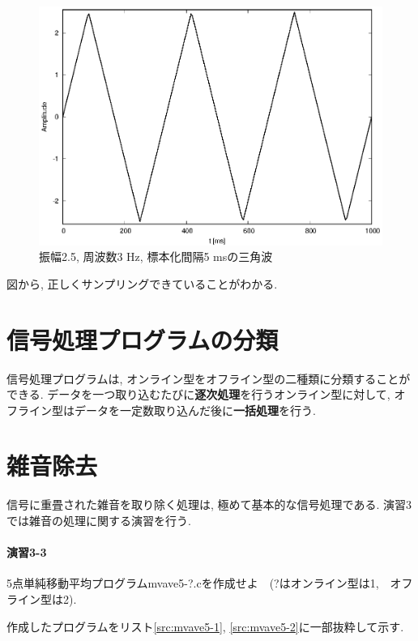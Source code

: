 \documentclass[titlepage]{jsarticle}
\begin{document}
        \begin{figure}[h]
            \centering
            \includegraphics[width=0.8\hsize]{images/triaft.eps}
            \caption{振幅2.5, 周波数3 Hz, 標本化間隔5 msの三角波}
            \label{fig:triaft}
        \end{figure}

        図から, 正しくサンプリングできていることがわかる.

\section{信号処理プログラムの分類}
    信号処理プログラムは, オンライン型をオフライン型の二種類に分類することができる.
    データを一つ取り込むたびに\textbf{逐次処理}を行うオンライン型に対して,
    オフライン型はデータを一定数取り込んだ後に\textbf{一括処理}を行う.

\section{雑音除去}
    信号に重畳された雑音を取り除く処理は, 極めて基本的な信号処理である.
    演習3では雑音の処理に関する演習を行う.

    \paragraph{演習3-3} 5点単純移動平均プログラムmvave5-?.cを作成せよ　(?はオンライン型は1,　オフライン型は2).

        作成したプログラムをリスト\ref{src:mvave5-1}, \ref{src:mvave5-2}に一部抜粋して示す.
\end{document}
